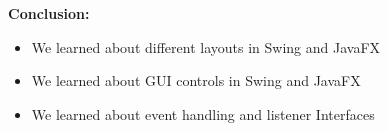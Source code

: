 \documentclass{book}
\begin{document}
{\begin{enumerate}
\begin{itemize}
{        }
    \end{itemize}
    \end{enumerate}
    \par
    \textbf{Conclusion:}
    \begin{itemize}
        \item We learned about different layouts in Swing and JavaFX
        \item We learned about GUI controls in Swing and JavaFX
        \item We learned about event handling and listener Interfaces
    \end{itemize}
}
\end{document}
